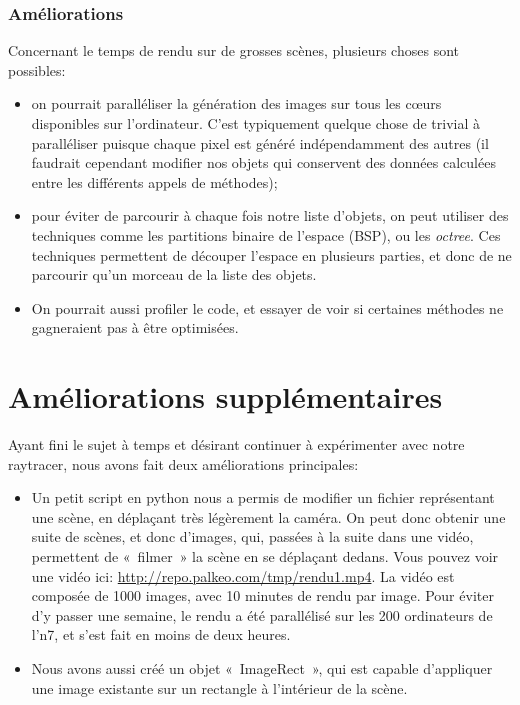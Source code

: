 \documentclass[a4paper]{article}
\begin{document}
    \subsubsection{Améliorations}
    Concernant le temps de rendu sur de grosses scènes, plusieurs choses sont possibles:
    \begin{itemize}
      \item on pourrait paralléliser la génération des images sur tous les
        cœurs disponibles sur l'ordinateur. C'est typiquement quelque chose de
        trivial à paralléliser puisque chaque pixel est généré indépendamment
        des autres (il faudrait cependant modifier nos objets qui conservent
        des données calculées entre les différents appels de méthodes);
      \item pour éviter de parcourir à chaque fois notre liste d'objets, on
        peut utiliser des techniques comme les partitions binaire de l'espace
        (BSP), ou les \textit{octree}. Ces techniques permettent de découper
        l'espace en plusieurs parties, et donc de ne parcourir qu'un morceau
        de la liste des objets.
      \item On pourrait aussi profiler le code, et essayer de voir si
        certaines méthodes ne gagneraient pas à être optimisées.
    \end{itemize}
    
\section{Améliorations supplémentaires}
Ayant fini le sujet à temps et désirant continuer à expérimenter avec notre raytracer, nous avons fait deux améliorations principales:
\begin{itemize}
    \item Un petit script en python nous a permis de modifier un fichier représentant une scène, en déplaçant très légèrement la caméra.
              On peut donc obtenir une suite de scènes, et donc d'images, qui, passées à la suite dans une vidéo, permettent de «~filmer~» la scène en se déplaçant dedans.
              Vous pouvez voir une vidéo ici: \url{http://repo.palkeo.com/tmp/rendu1.mp4}.
              La vidéo est composée de 1000 images, avec 10 minutes de rendu par image. Pour éviter d'y passer une semaine, le rendu a été parallélisé sur les 200 ordinateurs de l'n7, et s'est fait en moins de deux heures.
    \item Nous avons aussi créé un objet «~ImageRect~», qui est capable d'appliquer une image existante sur un rectangle à l'intérieur de la scène.
\end{itemize}
\end{document}
